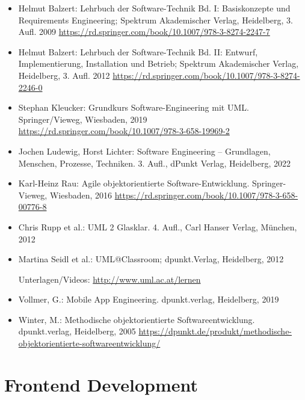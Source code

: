 \begin{itemize}
\tightlist
\item
  Helmut Balzert: Lehrbuch der Software-Technik Bd. I: Basiskonzepte und
  Requirements Engineering; Spektrum Akademischer Verlag, Heidelberg, 3.
  Aufl. 2009
  \url{https://rd.springer.com/book/10.1007/978-3-8274-2247-7}
\item
  Helmut Balzert: Lehrbuch der Software-Technik Bd. II: Entwurf,
  Implementierung, Installation und Betrieb; Spektrum Akademischer
  Verlag, Heidelberg, 3. Aufl. 2012
  \url{https://rd.springer.com/book/10.1007/978-3-8274-2246-0}
\item
  Stephan Kleucker: Grundkurs Software-Engineering mit UML.
  Springer/Vieweg, Wiesbaden, 2019
  \url{https://rd.springer.com/book/10.1007/978-3-658-19969-2}
\item
  Jochen Ludewig, Horst Lichter: Software Engineering -- Grundlagen,
  Menschen, Prozesse, Techniken. 3. Aufl., dPunkt Verlag, Heidelberg,
  2022
\item
  Karl-Heinz Rau: Agile objektorientierte Software-Entwicklung.
  Springer-Vieweg, Wiesbaden, 2016
  \url{https://rd.springer.com/book/10.1007/978-3-658-00776-8}
\item
  Chris Rupp et al.: UML 2 Glasklar. 4. Aufl., Carl Hanser Verlag,
  München, 2012
\item
  Martina Seidl et al.: UML@Classroom; dpunkt.Verlag, Heidelberg, 2012

  Unterlagen/Videos: \url{http://www.uml.ac.at/lernen}
\item
  Vollmer, G.: Mobile App Engineering. dpunkt.verlag, Heidelberg, 2019
\item
  Winter, M.: Methodische objektorientierte Softwareentwicklung.
  dpunkt.verlag, Heidelberg, 2005
  \url{https://dpunkt.de/produkt/methodische-objektorientierte-softwareentwicklung/}
\end{itemize}

\hypertarget{frontend-developmentpathlabel....srcmodulbeschreibungen-bachelor-bpo5ba_frontend-development}{%
\chapter{Frontend
Development\label{../../src/modulbeschreibungen-bachelor-bpo5/BA_Frontend-Development}}\label{frontend-developmentpathlabel....srcmodulbeschreibungen-bachelor-bpo5ba_frontend-development}}

